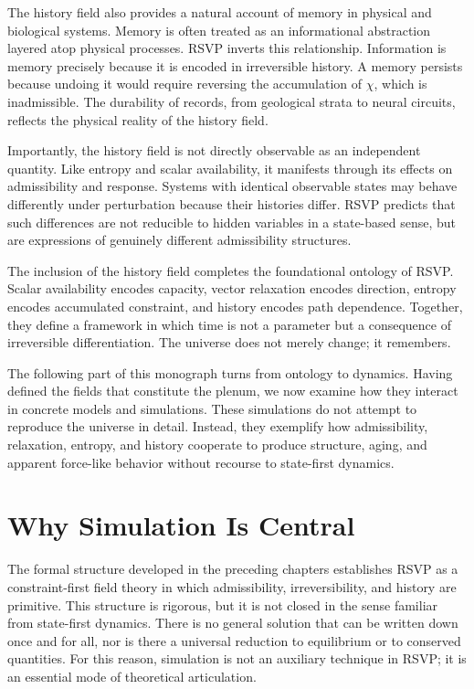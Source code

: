 \documentclass[11pt,oneside]{book}
\begin{document}
The history field also provides a natural account of memory in physical and biological systems. Memory is often treated as an informational abstraction layered atop physical processes. RSVP inverts this relationship. Information is memory precisely because it is encoded in irreversible history. A memory persists because undoing it would require reversing the accumulation of $\chi$, which is inadmissible. The durability of records, from geological strata to neural circuits, reflects the physical reality of the history field.

Importantly, the history field is not directly observable as an independent quantity. Like entropy and scalar availability, it manifests through its effects on admissibility and response. Systems with identical observable states may behave differently under perturbation because their histories differ. RSVP predicts that such differences are not reducible to hidden variables in a state-based sense, but are expressions of genuinely different admissibility structures.

The inclusion of the history field completes the foundational ontology of RSVP. Scalar availability encodes capacity, vector relaxation encodes direction, entropy encodes accumulated constraint, and history encodes path dependence. Together, they define a framework in which time is not a parameter but a consequence of irreversible differentiation. The universe does not merely change; it remembers.

The following part of this monograph turns from ontology to dynamics. Having defined the fields that constitute the plenum, we now examine how they interact in concrete models and simulations. These simulations do not attempt to reproduce the universe in detail. Instead, they exemplify how admissibility, relaxation, entropy, and history cooperate to produce structure, aging, and apparent force-like behavior without recourse to state-first dynamics.

\chapter{Why Simulation Is Central}

The formal structure developed in the preceding chapters establishes RSVP as a constraint-first field theory in which admissibility, irreversibility, and history are primitive. This structure is rigorous, but it is not closed in the sense familiar from state-first dynamics. There is no general solution that can be written down once and for all, nor is there a universal reduction to equilibrium or to conserved quantities. For this reason, simulation is not an auxiliary technique in RSVP; it is an essential mode of theoretical articulation.
\end{document}
